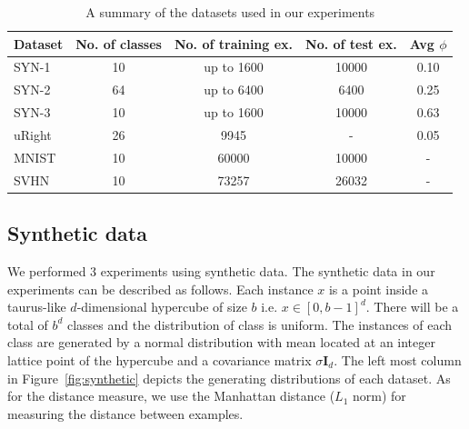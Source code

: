 \documentclass{article}
\begin{document}
\begin{table}[tb]
\caption{A summary of the datasets used in our experiments}
\label{table:results}
\vskip 0.15in
\begin{center}
\begin{small}
\begin{sc}
\begin{tabular}{lcccc}
  \hline
  \abovespace\belowspace
  Dataset & No. of classes & No. of training ex. & No. of test
  ex. & Avg $\phi$ \\
  \hline
  \abovespace
  SYN-1 & 10 & up to 1600 & 10000 & 0.10\\
  SYN-2 & 64 & up to 6400 & 6400 & 0.25\\
  \belowspace
  SYN-3 & 10 & up to 1600 & 10000 & 0.63\\
  \hline
  \abovespace
  uRight & 26 & 9945 & -  & 0.05\\
  MNIST & 10 & 60000 & 10000 & - \\
  \belowspace
  SVHN & 10 & 73257 & 26032 &-\\
  \hline
\end{tabular}
\end{sc}
\end{small}
\end{center}
\vskip -0.1in
\end{table}

\subsection{Synthetic data}
We performed 3 experiments using synthetic data. The synthetic data in
our experiments can be described as follows. Each instance $x$ is a
point inside a taurus-like $d$-dimensional hypercube of size $b$
i.e. $x \in [0,b-1]^d$. There will be a total of $b^d$ classes and the
distribution of class is uniform. The instances of each class are
generated by a normal distribution with mean located at an integer
lattice point of the hypercube and a covariance matrix $\sigma
\mathbf{I}_d$. The left most column in Figure~\ref{fig:synthetic}
depicts the generating distributions of each dataset. As for the
distance measure, we use the Manhattan distance ($L_1$ norm) for
measuring the distance between examples.
\end{document}
